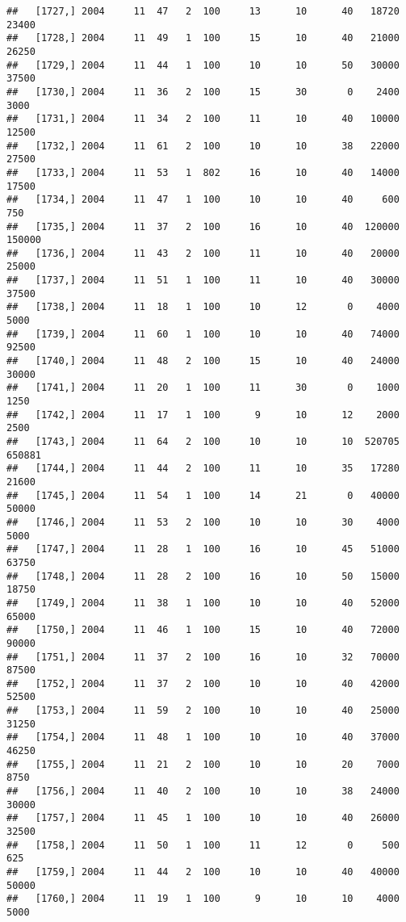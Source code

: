 \documentclass{article}\usepackage[]{graphicx}\usepackage[]{color}
\makeatletter
\newenvironment{kframe}{%
 \def\at@end@of@kframe{}%
 \ifinner\ifhmode%
  \def\at@end@of@kframe{\end{minipage}}%
  \begin{minipage}{\columnwidth}%
 \fi\fi%
 \def\FrameCommand##1{\hskip\@totalleftmargin \hskip-\fboxsep
 \colorbox{shadecolor}{##1}\hskip-\fboxsep
     \hskip-\linewidth \hskip-\@totalleftmargin \hskip\columnwidth}%
 \MakeFramed {\advance\hsize-\width
   \@totalleftmargin\z@ \linewidth\hsize
   \@setminipage}}%
 {\par\unskip\endMakeFramed%
 \at@end@of@kframe}
\newenvironment{knitrout}{}{} %
\makeatother
\begin{document}
\begin{knitrout}
\begin{kframe}
\begin{verbatim}
##   [1727,] 2004     11  47   2  100     13      10      40   18720   23400
##   [1728,] 2004     11  49   1  100     15      10      40   21000   26250
##   [1729,] 2004     11  44   1  100     10      10      50   30000   37500
##   [1730,] 2004     11  36   2  100     15      30       0    2400    3000
##   [1731,] 2004     11  34   2  100     11      10      40   10000   12500
##   [1732,] 2004     11  61   2  100     10      10      38   22000   27500
##   [1733,] 2004     11  53   1  802     16      10      40   14000   17500
##   [1734,] 2004     11  47   1  100     10      10      40     600     750
##   [1735,] 2004     11  37   2  100     16      10      40  120000  150000
##   [1736,] 2004     11  43   2  100     11      10      40   20000   25000
##   [1737,] 2004     11  51   1  100     11      10      40   30000   37500
##   [1738,] 2004     11  18   1  100     10      12       0    4000    5000
##   [1739,] 2004     11  60   1  100     10      10      40   74000   92500
##   [1740,] 2004     11  48   2  100     15      10      40   24000   30000
##   [1741,] 2004     11  20   1  100     11      30       0    1000    1250
##   [1742,] 2004     11  17   1  100      9      10      12    2000    2500
##   [1743,] 2004     11  64   2  100     10      10      10  520705  650881
##   [1744,] 2004     11  44   2  100     11      10      35   17280   21600
##   [1745,] 2004     11  54   1  100     14      21       0   40000   50000
##   [1746,] 2004     11  53   2  100     10      10      30    4000    5000
##   [1747,] 2004     11  28   1  100     16      10      45   51000   63750
##   [1748,] 2004     11  28   2  100     16      10      50   15000   18750
##   [1749,] 2004     11  38   1  100     10      10      40   52000   65000
##   [1750,] 2004     11  46   1  100     15      10      40   72000   90000
##   [1751,] 2004     11  37   2  100     16      10      32   70000   87500
##   [1752,] 2004     11  37   2  100     10      10      40   42000   52500
##   [1753,] 2004     11  59   2  100     10      10      40   25000   31250
##   [1754,] 2004     11  48   1  100     10      10      40   37000   46250
##   [1755,] 2004     11  21   2  100     10      10      20    7000    8750
##   [1756,] 2004     11  40   2  100     10      10      38   24000   30000
##   [1757,] 2004     11  45   1  100     10      10      40   26000   32500
##   [1758,] 2004     11  50   1  100     11      12       0     500     625
##   [1759,] 2004     11  44   2  100     10      10      40   40000   50000
##   [1760,] 2004     11  19   1  100      9      10      10    4000    5000

\end{verbatim}
\end{kframe}
\end{knitrout}
\end{document}
